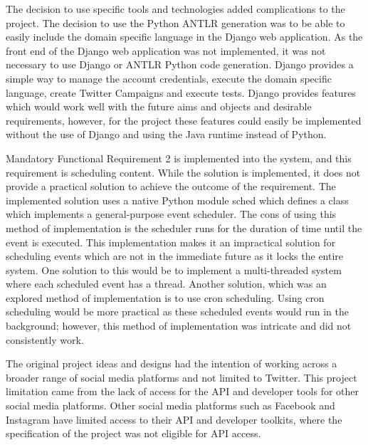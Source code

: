 The decision to use specific tools and technologies added complications to the project. The decision to use the Python ANTLR generation was to be able to easily include the domain specific language in the Django web application. As the front end of the Django web application was not implemented, it was not necessary to use Django or ANTLR Python code generation. Django provides a simple way to manage the account credentials, execute the domain specific language, create Twitter Campaigns and execute tests. Django provides features which would work well with the future aims and objects and desirable requirements, however, for the project these features could easily be implemented without the use of Django and using the Java runtime instead of Python. \newline \par

Mandatory Functional Requirement 2 is implemented into the system, and this requirement is scheduling content. While the solution is implemented, it does not provide a practical solution to achieve the outcome of the requirement. The implemented solution uses a native Python module sched which defines a class which implements a general-purpose event scheduler. The cons of using this method of implementation is the scheduler runs for the duration of time until the event is executed. This implementation makes it an impractical solution for scheduling events which are not in the immediate future as it locks the entire system. One solution to this would be to implement a multi-threaded system where each scheduled event has a thread. Another solution, which was an explored method of implementation is to use cron scheduling. Using cron scheduling would be more practical as these scheduled events would run in the background; however, this method of implementation was intricate and did not consistently work. \newline \par

The original project ideas and designs had the intention of working across a broader range of social media platforms and not limited to Twitter. This project limitation came from the lack of access for the API and developer tools for other social media platforms. Other social media platforms such as Facebook and Instagram have limited access to their API and developer toolkits, where the specification of the project was not eligible for API access. \newline \par